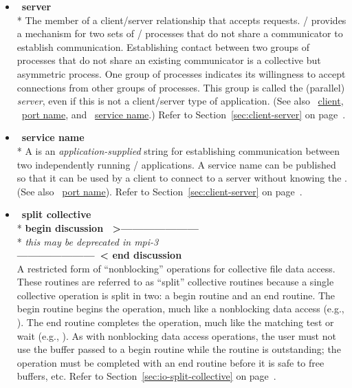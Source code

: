 \begin{itemize}
\label{glossary:server}
\item  ~\hypertarget{glossary:server}{\textbf{server}} \\*
The member of a client/server relationship that accepts requests.
 \MPI/ provides a mechanism for two sets of \MPI/  processes that do not share a communicator
to establish communication.
Establishing contact between two groups of processes that do not share an
existing communicator is a collective but asymmetric process.  One group of
processes indicates its willingness to accept connections from other groups of
processes.  This group is called the (parallel) \emph{server}, even if this
is not a client/server type of application.  
(See also ~\hyperlink{glossary:client}{client}, ~\hyperlink{glossary:port_name}{port name},
and ~\hyperlink{glossary:service_name}{service name}.) 
Refer to Section~\ref{sec:client-server} on page~\pageref{sec:client-server}.

\label{glossary:service_name}
\item  ~\hypertarget{glossary:service_name}{\textbf{service name}} \\*
A  is an {\em application-supplied} string for 
establishing communication between two independently running \MPI/ applications.
A service name can be published so that it
can be used by a client to connect to a server without knowing the  .
(See also ~\hyperlink{glossary:port_name}{port name}). 
Refer to Section~\ref{sec:client-server} on page~\pageref{sec:client-server}.

\label{glossary:split_collective}
\item  ~\hypertarget{glossary:split_collective}{\textbf{split collective}} \\*
        \textbf{begin discussion ~\textgreater{}---------------------} \\*
        \emph{ this may be deprecated in mpi-3 } \\
        \textbf{---------------------~\textless{} end discussion}  \\
A restricted form of ``nonblocking'' operations
for collective file data access.
These routines are referred to as ``split'' collective routines
because a single collective operation is split in two:
a begin routine and an end routine.
The begin routine begins the operation,
much like a nonblocking data access (e.g., ).
The end routine completes the operation,
much like the matching test or wait (e.g., ).
As with nonblocking data access operations,
the user must not use the buffer
passed to a begin routine while the routine is outstanding;
the operation must be completed with an end routine before it
is safe to free buffers, etc.
Refer to Section~\ref{sec:io-split-collective} on page~\pageref{sec:io-split-collective}.


\end{itemize}
